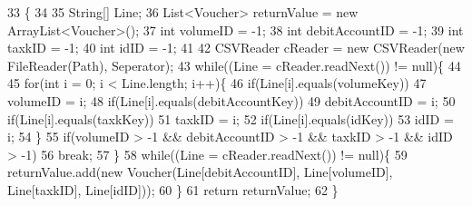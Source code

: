 \begin{DoxyCode}
33                                                                                                            
                                                                  \{
34         
35         String[] Line;
36         List<Voucher> returnValue = \textcolor{keyword}{new} ArrayList<Voucher>();
37         \textcolor{keywordtype}{int} volumeID = -1;
38         \textcolor{keywordtype}{int} debitAccountID = -1;
39         \textcolor{keywordtype}{int} taxkID = -1;
40         \textcolor{keywordtype}{int} idID = -1;
41         
42         CSVReader cReader = \textcolor{keyword}{new} CSVReader(\textcolor{keyword}{new} FileReader(Path), Seperator);
43         \textcolor{keywordflow}{while}((Line = cReader.readNext()) != null)\{
44             
45             \textcolor{keywordflow}{for}(\textcolor{keywordtype}{int} i = 0; i < Line.length; i++)\{
46                 \textcolor{keywordflow}{if}(Line[i].equals(volumeKey))
47                     volumeID = i;
48                 \textcolor{keywordflow}{if}(Line[i].equals(debitAccountKey))
49                     debitAccountID = i;
50                 \textcolor{keywordflow}{if}(Line[i].equals(taxkKey))
51                     taxkID = i;
52                 \textcolor{keywordflow}{if}(Line[i].equals(idKey))
53                     idID = i;
54             \}
55             \textcolor{keywordflow}{if}(volumeID > -1 && debitAccountID > -1 && taxkID > -1 && idID > -1)
56                 \textcolor{keywordflow}{break};
57         \}
58         \textcolor{keywordflow}{while}((Line = cReader.readNext()) != null)\{
59             returnValue.add(\textcolor{keyword}{new} Voucher(Line[debitAccountID], Line[volumeID], Line[taxkID], Line[idID]));
60         \}
61         \textcolor{keywordflow}{return} returnValue;
62     \}
\end{DoxyCode}
